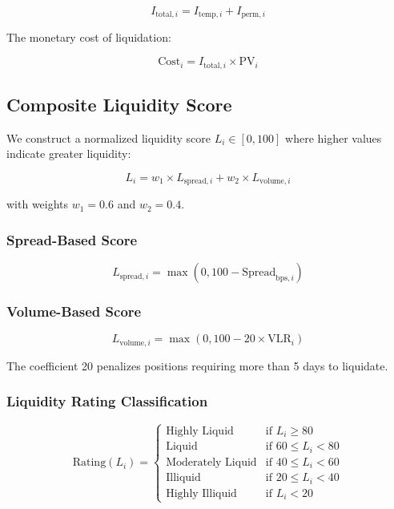 \documentclass[11pt,a4paper]{article}
\begin{document}
\begin{equation}
I_{\text{total},i} = I_{\text{temp},i} + I_{\text{perm},i}
\end{equation}

The monetary cost of liquidation:

\begin{equation}
\text{Cost}_i = I_{\text{total},i} \times \text{PV}_i
\end{equation}

\subsection{Composite Liquidity Score}

We construct a normalized liquidity score $L_i \in [0, 100]$ where higher values indicate greater liquidity:

\begin{equation}
L_i = w_1 \times L_{\text{spread},i} + w_2 \times L_{\text{volume},i}
\end{equation}

with weights $w_1 = 0.6$ and $w_2 = 0.4$.

\subsubsection{Spread-Based Score}

\begin{equation}
L_{\text{spread},i} = \max\left(0, 100 - \text{Spread}_{\text{bps},i}\right)
\end{equation}

\subsubsection{Volume-Based Score}

\begin{equation}
L_{\text{volume},i} = \max\left(0, 100 - 20 \times \text{VLR}_i\right)
\end{equation}

The coefficient 20 penalizes positions requiring more than 5 days to liquidate.

\subsubsection{Liquidity Rating Classification}

\begin{equation}
\text{Rating}(L_i) = \begin{cases}
\text{Highly Liquid} & \text{if } L_i \geq 80 \\
\text{Liquid} & \text{if } 60 \leq L_i < 80 \\
\text{Moderately Liquid} & \text{if } 40 \leq L_i < 60 \\
\text{Illiquid} & \text{if } 20 \leq L_i < 40 \\
\text{Highly Illiquid} & \text{if } L_i < 20
\end{cases}
\end{equation}
\end{document}
